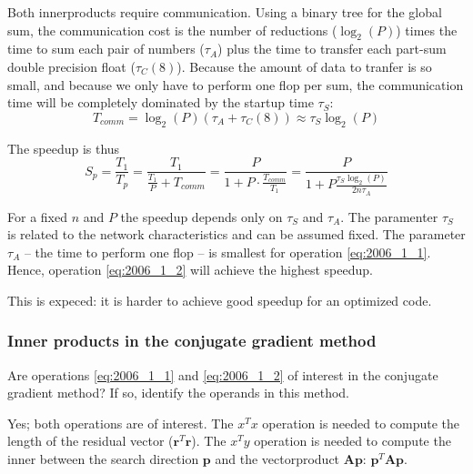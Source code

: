 Both innerproducts require communication. Using a binary tree for the global sum, the communication cost is the number of reductions ($\log_2(P)$) times the time to sum each pair of numbers ($\tau_A$) plus the time to transfer each part-sum double precision float ($\tau_C(8)$). Because the amount of data to tranfer is so small, and because we only have to perform one flop per sum, the communication time will be completely dominated by the startup time $\tau_S$:
\begin{equation}
  T_{comm} = \log_2(P) \left( \tau_A + \tau_C(8) \right) \approx \tau_S \log_2(P)
\end{equation}



The speedup is thus
\begin{equation}
  S_p = \frac{T_1}{T_p}
  = \frac{T_1}{\frac{T_1}{P} + T_{comm}}
  = \frac{P}{1+P\cdot \frac{T_{comm}}{T_1}}
  = \frac{P}{1+P\frac{\tau_{S}\log_{2}\left(P\right)}{2n\tau_{A}}}
\end{equation}

For a fixed $n$ and $P$ the speedup depends only on $\tau_S$ and $\tau_A$. The paramenter $\tau_S$ is related to the network characteristics and can be assumed fixed. The parameter $\tau_A$ -- the time to perform one flop -- is smallest for operation \eqref{eq:2006_1_1}. Hence, operation \eqref{eq:2006_1_2} will achieve the highest speedup.

This is expeced: it is harder to achieve good speedup for an optimized code.


\subsubsection{Inner products in the conjugate gradient method} %
\label{ssub:inner_products_in_the_conjugate_gradient_method}

\begin{question}
  Are operations \eqref{eq:2006_1_1} and \eqref{eq:2006_1_2} of interest in the conjugate gradient method? If so, identify the operands in this method.
\end{question}

Yes; both operations are of interest. The $x^Tx$ operation is needed to compute the length of the residual vector ($\mathbf{r}^T \mathbf{r}$). The $x^T y$ operation is needed to compute the inner between the search direction $\mathbf{p}$ and the vectorproduct $\mathbf{Ap}$: $\mathbf{p}^T \mathbf{Ap}$.

